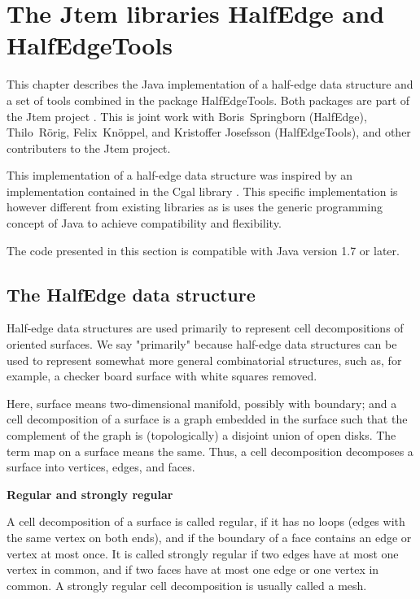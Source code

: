 \documentclass[Thesis.tex]{subfiles}
\begin{document}
\chapter{The {\sc Jtem} libraries {\sc HalfEdge} and {\sc HalfEdgeTools}}
\label{chp:halfedge}

This chapter describes the {\sc Java} implementation of a half-edge data structure and a set of tools
combined in the package {\sc HalfEdgeTools}. Both packages are part of the {\sc Jtem} project
\cite{JtemWebsite}. This is joint work with Boris~Springborn ({\sc HalfEdge}), Thilo~R{\"o}rig, 
Felix~Kn{\"o}ppel, and Kristoffer Josefsson ({\sc HalfEdgeTools}), and
other contributers to the {\sc Jtem} project.

This implementation of a half-edge data structure was inspired by an implementation 
contained in the {\sc Cgal} library \cite{Kettner2000}.
This specific implementation is however different from existing libraries as is uses the generic
programming concept of {\sc Java} to achieve compatibility and flexibility.

The code presented in this section is compatible with {\sc Java} version 1.7 or later.

\label{sec:halfedge_halfedgetools}
\section{The {\sc HalfEdge} data structure}
\label{sec:halfedge}

Half-edge data structures are used primarily to represent cell decompositions of oriented surfaces.
We say "primarily" because half-edge data structures can be used to represent somewhat more general
combinatorial structures, such as, for example, a checker board surface with white squares removed.

Here, surface means two-dimensional manifold, possibly with boundary; and a cell decomposition 
of a surface is a graph embedded in the surface such that the complement of the graph is 
(topologically) a disjoint union of open disks. The term map on a surface means the same. 
Thus, a cell decomposition decomposes a surface into vertices, edges, and faces.

{\bf Regular and strongly regular}

A cell decomposition of a surface is called regular, if it has no loops (edges with the same vertex 
on both ends), and if the boundary of a face contains an edge or vertex at most once. It is called 
strongly regular if two edges have at most one vertex in common, and if two faces have at most 
one edge or one vertex in common. A strongly regular cell decomposition is usually called a mesh.
\end{document}

